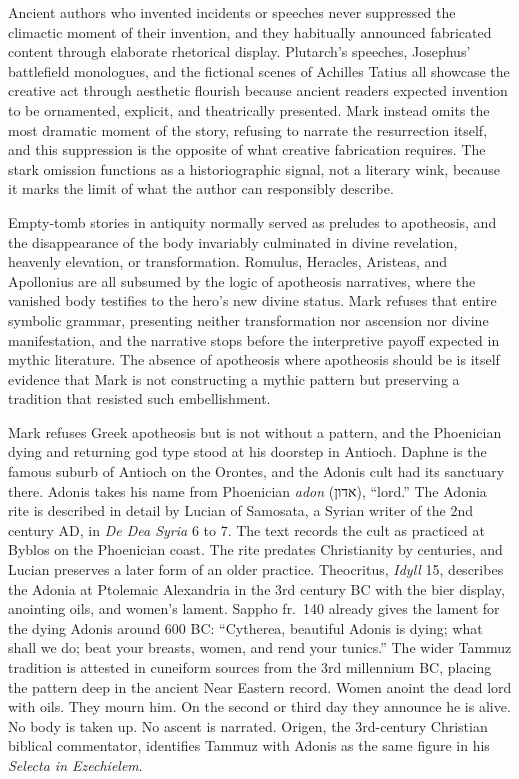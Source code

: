 Ancient authors who invented incidents or speeches never suppressed the climactic moment of their invention, and they habitually announced fabricated content through elaborate rhetorical display.
Plutarch's speeches, Josephus' battlefield monologues, and the fictional scenes of Achilles Tatius \cite{achillestatius:leucippe} all showcase the creative act through aesthetic flourish because ancient readers expected invention to be ornamented, explicit, and theatrically presented.
Mark instead omits the most dramatic moment of the story, refusing to narrate the resurrection itself, and this suppression is the opposite of what creative fabrication requires.
The stark omission functions as a historiographic signal, not a literary wink, because it marks the limit of what the author can responsibly describe.

Empty-tomb stories in antiquity normally served as preludes to apotheosis, and the disappearance of the body invariably culminated in divine revelation, heavenly elevation, or transformation.
Romulus, Heracles, Aristeas, and Apollonius are all subsumed by the logic of apotheosis narratives, where the vanished body testifies to the hero's new divine status.
Mark refuses that entire symbolic grammar, presenting neither transformation nor ascension nor divine manifestation, and the narrative stops before the interpretive payoff expected in mythic literature.
The absence of apotheosis where apotheosis should be is itself evidence that Mark is not constructing a mythic pattern but preserving a tradition that resisted such embellishment.

Mark refuses Greek apotheosis but is not without a pattern, and the Phoenician dying and returning god type stood at his doorstep in Antioch.
Daphne is the famous suburb of Antioch on the Orontes, and the Adonis cult had its sanctuary there.
Adonis takes his name from Phoenician \emph{adon} (אדון), ``lord.''
The Adonia rite is described in detail by Lucian of Samosata, a Syrian writer of the 2nd century AD, in \emph{De Dea Syria} 6 to 7.
The text records the cult as practiced at Byblos on the Phoenician coast.
The rite predates Christianity by centuries, and Lucian preserves a later form of an older practice.
Theocritus, \emph{Idyll} 15, describes the Adonia at Ptolemaic Alexandria in the 3rd century BC with the bier display, anointing oils, and women's lament.
Sappho fr.\ 140 already gives the lament for the dying Adonis around 600 BC: ``Cytherea, beautiful Adonis is dying; what shall we do; beat your breasts, women, and rend your tunics.''
The wider Tammuz tradition is attested in cuneiform sources from the 3rd millennium BC, placing the pattern deep in the ancient Near Eastern record.
Women anoint the dead lord with oils.
They mourn him.
On the second or third day they announce he is alive.
No body is taken up.
No ascent is narrated.
Origen, the 3rd-century Christian biblical commentator, identifies Tammuz with Adonis as the same figure in his \emph{Selecta in Ezechielem}.

